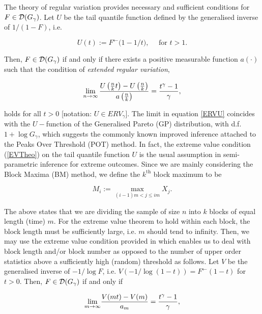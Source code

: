 The theory of regular variation \citep{Binghametal:87,deHaan:70, deHF:06} provides necessary and sufficient conditions for $F\in {\ensuremath{\mathcal{D}}}(G_{\gamma})$. Let $U$ be the tail quantile function defined by the generalised inverse of $1/(1-F)$, i.e.


\begin{equation*}
U(t):=   F^{\leftarrow} \bigl( 1-1/t\bigr), \quad \mbox{ for } t >  1.
\end{equation*}


Then, $F\in {\ensuremath{\mathcal{D}}}(G_{\gamma})$ if and only if there exists a positive  measurable function $a(\cdot)$ such that the condition of \emph{extended regular variation},


\begin{equation}\label{ERVU}
	\displaystyle {\lim_{n \rightarrow{\infty}}}\,\frac{U\left(\frac{n}{k}t\right)-U\left(\frac{n}{k}\right)}{a\left(\frac{n}{k}\right)}= \frac{t^{\gamma}-1}{\gamma},
\end{equation}


holds for all $t>0$ [notation: $U\in ERV_{\gamma}$]. The limit in equation \ref{ERVU} coincides with the $U-$function of the Generalised Pareto (GP) distribution, with d.f. $ 1+ \log G_ \gamma $, which suggests the commonly known improved inference attached to the Peaks Over Threshold (POT) method. In fact, the extreme value condition (\ref{EVTheo}) on the tail quantile function $ U $ is the usual assumption in semi-parametric inference for extreme outcomes. Since we are mainly considering the Block Maxima (BM) method, we define the $ k^{\text{th}} $ block maximum to be

\begin{equation}
M_i := \max _{(i -1) m < j \le i m} X_j.
\end{equation}

\noindent The above states that we are dividing the sample of size $n$ into $k$ blocks of equal length (time) $m$. For the extreme value theorem to hold within each block, the block length must be sufficiently large, i.e. $m$ should tend to infinity. Then, we may use the extreme value condition provided in \citet{FdeH:15} which enables us to deal with block length and/or block number as opposed to the number of upper order statistics above a sufficiently high (random) threshold as follows. Let $V$ be the generalised inverse of $ -1/\log F $, i.e. $ V(-1 / \log( 1 - t ) ) = F^{\leftarrow}( 1 - t )$ for $ t > 0 $. Then, $F \in {\ensuremath{\mathcal{D}}} ( G_\gamma )$ if and only if


\begin{equation} \label{EVTheo2}
\displaystyle {\lim_{m \rightarrow{\infty}}} \frac{V(mt) - V(m)}{a_m} = \frac{t^\gamma - 1}{\gamma},
\end{equation}


